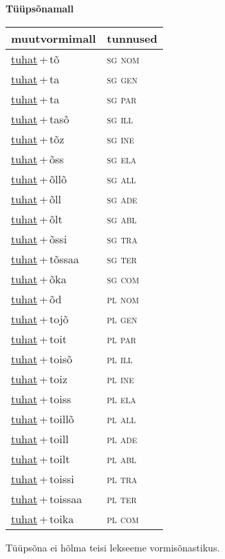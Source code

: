 
\vspace{1.8em}
\begin{minipage}{\textwidth}
\textbf{Tüüpsõnamall \,}\\

\begin{sideways}
\begin{tabular}{l l}
muutvormimall & tunnused \\
\hline
\underline{tuhat}\,+\,tõ & \textsc{ sg nom } \\
\underline{tuhat}\,+\,ta & \textsc{ sg gen } \\
\underline{tuhat}\,+\,ta & \textsc{ sg par } \\
\underline{tuhat}\,+\,tasõ & \textsc{ sg ill } \\
\underline{tuhat}\,+\,tõz & \textsc{ sg ine } \\
\underline{tuhat}\,+\,õss & \textsc{ sg ela } \\
\underline{tuhat}\,+\,õllõ & \textsc{ sg all } \\
\underline{tuhat}\,+\,õll & \textsc{ sg ade } \\
\underline{tuhat}\,+\,õlt & \textsc{ sg abl } \\
\underline{tuhat}\,+\,õssi & \textsc{ sg tra } \\
\underline{tuhat}\,+\,tõssaa & \textsc{ sg ter } \\
\underline{tuhat}\,+\,õka & \textsc{ sg com } \\
\underline{tuhat}\,+\,õd & \textsc{ pl nom } \\
\underline{tuhat}\,+\,tojõ & \textsc{ pl gen } \\
\underline{tuhat}\,+\,toit & \textsc{ pl par } \\
\underline{tuhat}\,+\,toisõ & \textsc{ pl ill } \\
\underline{tuhat}\,+\,toiz & \textsc{ pl ine } \\
\underline{tuhat}\,+\,toiss & \textsc{ pl ela } \\
\underline{tuhat}\,+\,toillõ & \textsc{ pl all } \\
\underline{tuhat}\,+\,toill & \textsc{ pl ade } \\
\underline{tuhat}\,+\,toilt & \textsc{ pl abl } \\
\underline{tuhat}\,+\,toissi & \textsc{ pl tra } \\
\underline{tuhat}\,+\,toissaa & \textsc{ pl ter } \\
\underline{tuhat}\,+\,toika & \textsc{ pl com } \\
\end{tabular}
\end{sideways}
\label{tab:tüüpsõnamall-tuhattõ}

\end{minipage}

 
\vspace{1em}
\noindent Tüüpsõna ei hõlma teisi lekseeme vormi\-sõnastikus.
